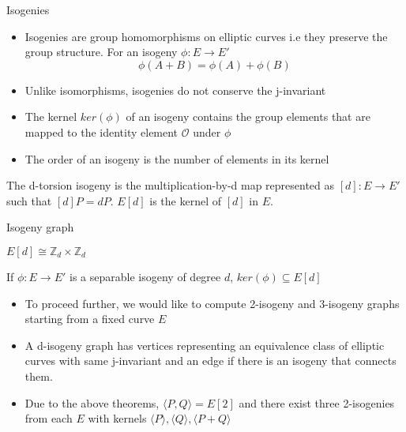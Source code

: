 \documentclass{beamer}
\begin{document}
\begin{frame}{Isogenies}
\begin{itemize}
    \item Isogenies are group homomorphisms on elliptic curves i.e they preserve the group structure. For an isogeny $\phi: E \rightarrow E'$
    $$\phi(A+B) = \phi(A) + \phi(B)$$
    \item Unlike isomorphisms, isogenies do not conserve the j-invariant
    \item The kernel $ker(\phi)$ of an isogeny contains the group elements that are mapped to the identity element $\mathcal{O}$ under $\phi$
    \item The order of an isogeny is the number of elements in its kernel 
\end{itemize}
\begin{definition}
    The d-torsion isogeny is the multiplication-by-d map represented as $[d]: E \rightarrow E'$ such that $[d]P = dP$. $E[d]$ is the kernel of $[d]$ in $E$.
\end{definition}
\end{frame}

\begin{frame}{Isogeny graph}
\begin{theorem}
$E[d] \cong \mathbb{Z}_d \times \mathbb{Z}_d$
\end{theorem}
\begin{theorem}
If $\phi: E \rightarrow E'$ is a separable isogeny of degree $d$, $ker(\phi) \subseteq E[d]$
\end{theorem}
\begin{itemize}
    \item To proceed further, we would like to compute 2-isogeny and 3-isogeny graphs starting from a fixed curve $E$
    \item A d-isogeny graph has vertices representing an equivalence class of elliptic curves with same j-invariant and an edge if there is an isogeny that connects them.
    \item Due to the above theorems, $\langle P, Q \rangle = E[2]$ and there exist three 2-isogenies from each $E$ with kernels $\langle P \rangle, \langle Q \rangle, \langle P+Q \rangle$
\end{itemize}
\end{frame}
\end{document}
